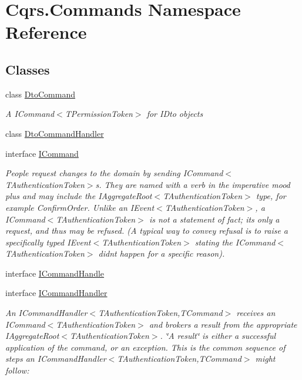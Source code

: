 \hypertarget{namespaceCqrs_1_1Commands}{}\section{Cqrs.\+Commands Namespace Reference}
\label{namespaceCqrs_1_1Commands}
\subsection*{Classes}
\begin{DoxyCompactItemize}
\item 
class \hyperlink{classCqrs_1_1Commands_1_1DtoCommand}{Dto\+Command}
\begin{DoxyCompactList}\small\item\em A I\+Command$<$\+T\+Permission\+Token$>$ for I\+Dto objects \end{DoxyCompactList}\item 
class \hyperlink{classCqrs_1_1Commands_1_1DtoCommandHandler}{Dto\+Command\+Handler}
\item 
interface \hyperlink{interfaceCqrs_1_1Commands_1_1ICommand}{I\+Command}
\begin{DoxyCompactList}\small\item\em People request changes to the domain by sending I\+Command$<$\+T\+Authentication\+Token$>$s. They are named with a verb in the imperative mood plus and may include the I\+Aggregate\+Root$<$\+T\+Authentication\+Token$>$ type, for example Confirm\+Order. Unlike an I\+Event$<$\+T\+Authentication\+Token$>$, a I\+Command$<$\+T\+Authentication\+Token$>$ is not a statement of fact; it\textquotesingle{}s only a request, and thus may be refused. (A typical way to convey refusal is to raise a specifically typed I\+Event$<$\+T\+Authentication\+Token$>$ stating the I\+Command$<$\+T\+Authentication\+Token$>$ didn\textquotesingle{}t happen for a specific reason). \end{DoxyCompactList}\item 
interface \hyperlink{interfaceCqrs_1_1Commands_1_1ICommandHandle}{I\+Command\+Handle}
\item 
interface \hyperlink{interfaceCqrs_1_1Commands_1_1ICommandHandler}{I\+Command\+Handler}
\begin{DoxyCompactList}\small\item\em An I\+Command\+Handler$<$\+T\+Authentication\+Token,\+T\+Command$>$ receives an I\+Command$<$\+T\+Authentication\+Token$>$ and brokers a result from the appropriate I\+Aggregate\+Root$<$\+T\+Authentication\+Token$>$. \char`\"{}\+A result\char`\"{} is either a successful application of the command, or an exception. This is the common sequence of steps an I\+Command\+Handler$<$\+T\+Authentication\+Token,\+T\+Command$>$ might follow\+: \end{DoxyCompactList}\item 

\end{DoxyCompactItemize}
